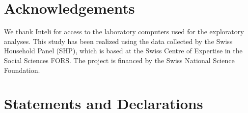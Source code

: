 \section*{Acknowledgements}
We thank Inteli for access to the laboratory computers used for the exploratory analyses. This study has been realized using the data collected by the Swiss Household Panel (SHP), which is based at the Swiss Centre of Expertise in the Social Sciences FORS. The project is financed by the Swiss National Science Foundation.

\section*{Statements and Declarations}


